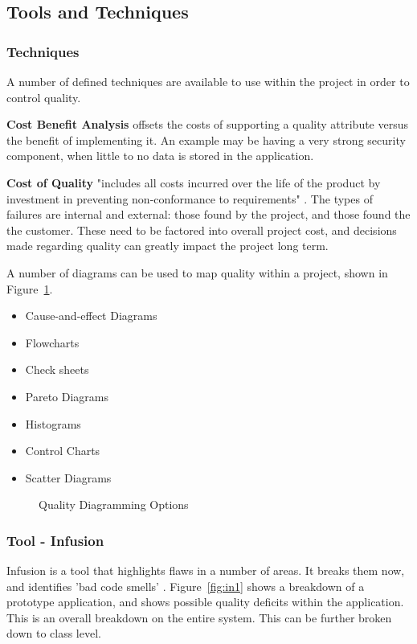 \subsection{Tools and Techniques}

\subsubsection{Techniques}

A number of defined techniques are available to use within the project in order to control quality. 

\textbf{Cost Benefit Analysis} offsets the costs of supporting a quality attribute versus the benefit of implementing it. An example may be having a very strong security component, when little to no data is stored in the application.

\textbf{Cost of Quality} "includes all costs incurred over the life of the product by investment in preventing non-conformance to requirements" \parencite{pmbok}. The types of failures are internal and external: those found by the project, and those found the the customer. These need to be factored into overall project cost, and decisions made regarding quality can greatly impact the project long term. 

A number of diagrams can be used to map quality within a project, shown in Figure~\ref{fig:diagram}.

\begin{itemize}
\item Cause-and-effect Diagrams
\item Flowcharts
\item Check sheets
\item Pareto Diagrams
\item Histograms
\item Control Charts
\item Scatter Diagrams
\end{itemize}
\begin{figure}[H]
\caption{Quality Diagramming Options}
\label{fig:diagram}
\end{figure}

\subsubsection{Tool - Infusion}

Infusion is a tool that highlights flaws in a number of areas. It breaks them now, and identifies 'bad code smells' \parencite{fowler}. Figure~\ref{fig:in1} shows a breakdown of a prototype application, and shows possible quality deficits within the application. This is an overall breakdown on the entire system. This can be further broken down to class level.

